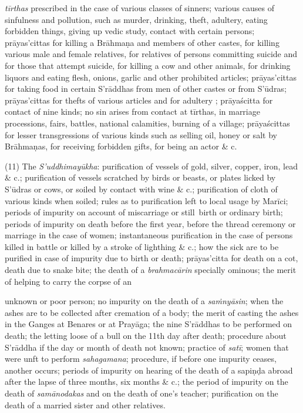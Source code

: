 \documentclass[11pt, openany]{book}
\begin{document}
\newpage

\noindent
\emph{\en tīrthas} prescribed in the case of various classes of sinners; various causes of sinfulness and pollution, such as murder, drinking, theft, adultery, eating forbidden things, giving up vedic study, contact with certain persons; prāyas'cittas for killing a Brāhmaṇa and members of other castes, for killing various male and female relatives, for relatives of persons committing suicide and for those that attempt suicide, for killing a cow and other animals, for drinking liquors and eating flesh, onions, garlic and other prohibited articles; prāyas'cittas for taking food in certain S'rāddhas from men of other castes or from S'ūdras; prāyas'cittas for thefts of various articles and for adultery ; prāyaścitta for contact of nine kinds; no sin arises from contact at tīrthas, in marriage processions, fairs, battles, national calamities, burning of a village; prāyaścittas for lesser transgressions of various kinds such as selling oil, honey or salt by Brāhmaṇas, for receiving forbidden gifts, for being an actor \& c.

(11) The \emph{\en S'uddhimayūkha}: purification of vessels of gold, silver, copper, iron, lead \& c.; purification of vessels scratched by birds or beasts, or plates licked by S'ūdras or cows, or soiled by contact with wine \& c.; purification of cloth of various kinds when soiled; rules as to purification left to local usage by Marīci; periods of impurity on account of miscarriage or still\textendash\ birth or ordinary birth; periods of impurity on death before the first year, before the thread ceremony or marriage in the case of women; instantaneous purification in the case of persons killed in battle or killed by a stroke of lighthing \& c.; how the sick are to be purified in case of impurity due to birth or death; prāyas'citta for death on a cot, death due to snake bite; the death of a \emph{\en brahmacārin} specially ominous; the merit of helping to carry the corpse of an 

\newpage

\noindent
unknown or poor person; no impurity on the death of a \emph{\en saṁnyāsin}; when the ashes are to be collected after cremation of a body; the merit of casting the ashes in the Ganges at Benares or at Prayāga; the nine S'rāddhas to be performed on death; the letting loose of a bull on the 11th day after death; procedure about S'rāddha if the day or month of death not known; practice of \emph{\en satī}; women that were unft to perform \emph{\en sahagamana}; procedure, if before one impurity ceases, another occurs; periods of impurity on hearing of the death of a sapiṇḍa abroad after the lapse of three months, six months \& c.; the period of impurity on the death of \emph{\en samānodakas} and on the death of one's teacher; purification on the death of a married sister and other relatives.
\end{document}
